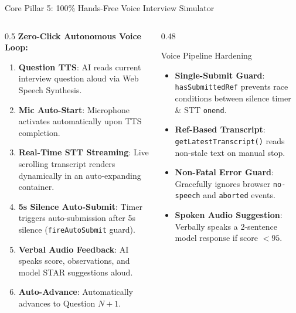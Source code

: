 \documentclass[aspectratio=169, 10pt]{beamer}
\begin{document}
\begin{frame}{Core Pillar 5: 100\% Hands-Free Voice Interview Simulator}
  \begin{columns}
    \begin{column}{0.5\textwidth}
      \textbf{Zero-Click Autonomous Voice Loop:}
      \begin{enumerate}
        \item \textbf{Question TTS}: AI reads current interview question aloud via Web Speech Synthesis.
        \item \textbf{Mic Auto-Start}: Microphone activates automatically upon TTS completion.
        \item \textbf{Real-Time STT Streaming}: Live scrolling transcript renders dynamically in an auto-expanding container.
        \item \textbf{5s Silence Auto-Submit}: Timer triggers auto-submission after 5s silence (\texttt{fireAutoSubmit} guard).
        \item \textbf{Verbal Audio Feedback}: AI speaks score, observations, and model STAR suggestions aloud.
        \item \textbf{Auto-Advance}: Automatically advances to Question $N+1$.
      \end{enumerate}
    \end{column}

    \begin{column}{0.48\textwidth}
      \begin{block}{Voice Pipeline Hardening}
        \small
        \begin{itemize}
          \item \textbf{Single-Submit Guard}: \texttt{hasSubmittedRef} prevents race conditions between silence timer \& STT \texttt{onend}.
          \item \textbf{Ref-Based Transcript}: \texttt{getLatestTranscript()} reads non-stale text on manual stop.
          \item \textbf{Non-Fatal Error Guard}: Gracefully ignores browser \texttt{no-speech} and \texttt{aborted} events.
          \item \textbf{Spoken Audio Suggestion}: Verbally speaks a 2-sentence model response if score $<95$.
        \end{itemize}
      \end{block}
    \end{column}
  \end{columns}
\end{frame}
\end{document}
